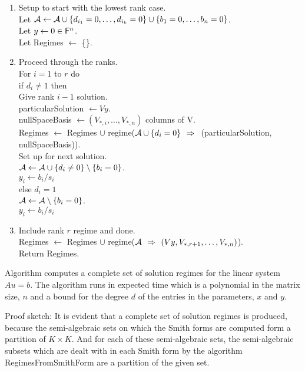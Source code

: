 \begin{enumerate}
\item \bc Setup to start with the lowest rank case.\ec\\
Let ${\cal A} \leftarrow {\cal A} 
  \cup \{d_{i_1} = 0, \ldots, d_{i_k} = 0\} 
  \cup \{b_1 = 0, \ldots, b_n = 0\}$.\\
Let $y \leftarrow 0 \in {\mathsf F}^n$.\\
Let Regimes $\leftarrow$ \{\}.\\
\item
\bc Proceed through the ranks. \ec\\
For $i = 1$ to $r$ do\\
\jog if $d_i \neq 1$ then\\
\jogg \bc Give rank $i-1$ solution.\ec\\
\jogg particularSolution $\leftarrow Vy$.\\
\jogg nullSpaceBasis $\leftarrow (V_{*,i}, \ldots, V_{*,n})$ \bc columns of V\ec.\\
\jogg Regimes $\leftarrow$ Regimes $\cup$ regime(${\cal A} \cup \{d_i = 0 \}{~~\Rightarrow~~} 
                                                   $(particularSolution, 
                                                   nullSpaceBasis)). \\
\jogg \bc Set up for next solution.\ec\\
\jogg ${\cal A} \leftarrow {\cal A} \cup \{d_i \neq 0\} \setminus \{b_i = 0 \}$. \\
\jogg $y_i \leftarrow b_i / s_i$\\
\jog else \bc $d_i = 1$ \ec\\
\jogg ${\cal A} \leftarrow {\cal A} \setminus \{b_i = 0 \}$. \\
\jogg $y_i \leftarrow b_i / s_i$\\
\item
\bc Include rank $r$ regime and done.\ec\\
Regimes $\leftarrow$ Regimes 
              $\cup$ regime(${\cal A} {~~\Rightarrow~~} (Vy, V_{*,r+1}, \ldots, V_{*,n})$).\\
Return Regimes.
\end{enumerate}

\begin{theorem}
Algorithm \StPLS computes a complete set of solution regimes for the linear
system $Au = b$.  The algorithm runs in expected time which is a polynomial in the 
matrix size, $n$ and a bound for the degree $d$ of the entries in the parameters, $x$ and $y$.
\end{theorem}

Proof sketch:
It is evident that a complete set of solution regimes is produced, because the semi-algebraic
sets on which the Smith forms are computed form a partition of $K\times K$.  And for each of these
semi-algebraic sets, the semi-algebraic
subsets which are dealt with in each Smith form by the algorithm RegimesFromSmithForm are a partition
of the given set.

